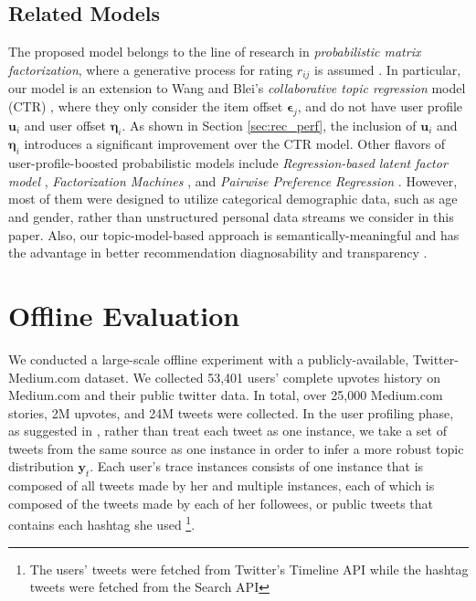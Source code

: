 \documentclass[conference]{IEEEtran}
\begin{document}
\subsection{Related Models}
The proposed model belongs to the line of research in \textit{probabilistic matrix factorization}, where a generative process for rating $r_{ij}$ is assumed \cite{mnih2007probabilistic,Salakhutdinov:2008:BPM:1390156.1390267,Ma:2008:SSR:1458082.1458205,wang2011collaborative}. In particular, our model is an extension to  Wang and Blei's \textit{collaborative topic regression} model (CTR) \cite{wang2011collaborative}, where they only consider the item offset $\mathbf{\epsilon}_j$, and do not have user profile $\mathbf{u}_i$ and user offset  $\mathbf{\eta}_i$. As shown in Section \ref{sec:rec_perf}, the inclusion of $\mathbf{u}_i$ and $\mathbf{\eta}_i$ introduces a significant improvement over the CTR model. Other flavors of user-profile-boosted probabilistic models  include \textit{Regression-based latent factor model} \cite{Agarwal:2009}, \textit{Factorization Machines} \cite{rendle2012factorization}, and \textit{Pairwise Preference Regression} \cite{Park:2009}. However, most of them were designed to utilize categorical demographic data, such as age and gender, rather than unstructured personal data streams we consider in this paper. Also, our topic-model-based approach is semantically-meaningful and has the advantage in better recommendation diagnosability and transparency \cite{wang2011collaborative,Herlocker:2000:ECF:358916.358995}.


\section{Offline Evaluation}
We conducted a large-scale offline experiment with a publicly-available, Twitter-Medium.com dataset. We collected 53,401 users' complete upvotes history on Medium.com and their public twitter data. In total, over 25,000 Medium.com stories, 2M upvotes, and 24M tweets were collected. In the user profiling phase, as suggested in \cite{Bhattacharya:2014:IUI:2645710.2645765}, rather than treat each tweet as one instance, we take a set of tweets from the same source as one instance in order to infer a more robust topic distribution $\mathbf{y}_t$. Each user's trace instances consists of one instance that is composed of all tweets made by her and multiple instances, each of which is composed of the tweets made by each of her followees, or public tweets that contains each hashtag she used \footnote{The users' tweets were fetched from Twitter's Timeline API while the hashtag tweets were fetched from the Search API}. 
\end{document}
